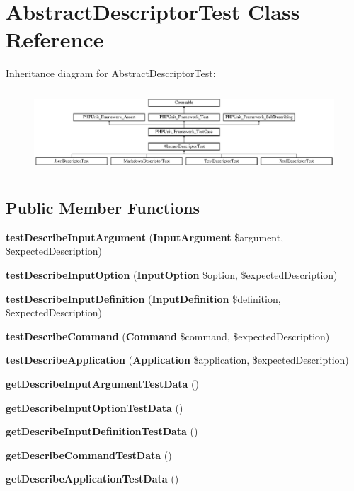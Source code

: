 \section{Abstract\+Descriptor\+Test Class Reference}
\label{class_symfony_1_1_component_1_1_console_1_1_tests_1_1_descriptor_1_1_abstract_descriptor_test}
Inheritance diagram for Abstract\+Descriptor\+Test\+:\begin{figure}[H]
\begin{center}
\leavevmode
\includegraphics[height=3.097345cm]{class_symfony_1_1_component_1_1_console_1_1_tests_1_1_descriptor_1_1_abstract_descriptor_test}
\end{center}
\end{figure}
\subsection*{Public Member Functions}
\begin{DoxyCompactItemize}
\item 
{\bf test\+Describe\+Input\+Argument} ({\bf Input\+Argument} \$argument, \$expected\+Description)
\item 
{\bf test\+Describe\+Input\+Option} ({\bf Input\+Option} \$option, \$expected\+Description)
\item 
{\bf test\+Describe\+Input\+Definition} ({\bf Input\+Definition} \$definition, \$expected\+Description)
\item 
{\bf test\+Describe\+Command} ({\bf Command} \$command, \$expected\+Description)
\item 
{\bf test\+Describe\+Application} ({\bf Application} \$application, \$expected\+Description)
\item 
{\bf get\+Describe\+Input\+Argument\+Test\+Data} ()
\item 
{\bf get\+Describe\+Input\+Option\+Test\+Data} ()
\item 
{\bf get\+Describe\+Input\+Definition\+Test\+Data} ()
\item 
{\bf get\+Describe\+Command\+Test\+Data} ()
\item 
{\bf get\+Describe\+Application\+Test\+Data} ()
\end{DoxyCompactItemize}
